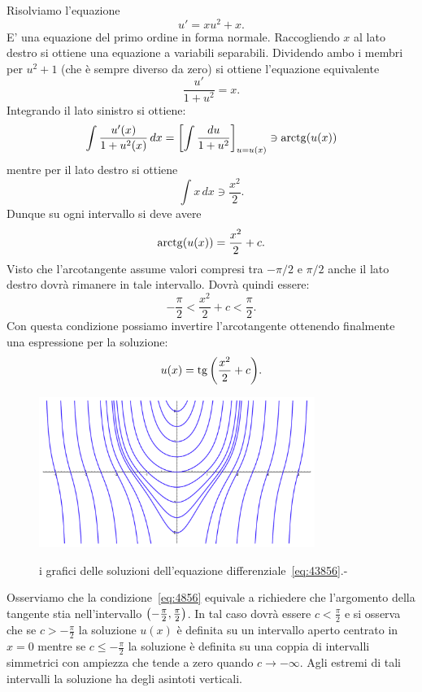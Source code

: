 \begin{example}
Risolviamo l'equazione
\begin{equation}\label{eq:43856}
  u' = x u^2 + x.
\end{equation}
E' una equazione del primo ordine in forma normale.
Raccogliendo $x$ al lato destro si ottiene una equazione a variabili separabili.
Dividendo ambo i membri per $u^2+1$ (che è sempre diverso da zero) si ottiene l'equazione equivalente
\[
\frac{u'}{1+u^2} = x.
\]
Integrando il lato sinistro si ottiene:
\[
  \int \frac{u'(x)}{1+u^2(x)}\, dx
  = {\left[ \int \frac{du}{1+u^2} \right]}_{u=u(x)}
  \ni \operatorname{arctg}(u(x))
\]
mentre per il lato destro si ottiene
\[
  \int x\, dx \ni \frac{x^2}{2}.
\]
Dunque su ogni intervallo si deve avere
\[
  \operatorname{arctg}(u(x)) = \frac{x^2}{2} + c.
\]
Visto che l'arcotangente assume valori compresi tra $-\pi/2$ e $\pi/2$ anche il lato destro dovrà rimanere in tale intervallo. Dovrà quindi essere:
\begin{equation}\label{eq:4856}
  -\frac \pi 2 < \frac {x^2} 2 + c < \frac \pi 2 .
\end{equation}
Con questa condizione possiamo invertire l'arcotangente ottenendo finalmente una espressione per la soluzione:
\begin{equation}\label{eq:45876314}
  u(x) = \operatorname{tg}{\left( \frac{x^2}{2} + c \right)}.
\end{equation}

\begin{figure}
\centering
\includegraphics[width=0.8\textwidth]{fig_43856.pdf}
\label{fig:43856}
\caption{i grafici delle soluzioni dell'equazione differenziale~\eqref{eq:43856}.-}
\end{figure}

Osserviamo che la condizione~\eqref{eq:4856} equivale a richiedere che l'argomento
della tangente stia nell'intervallo ${\left( -\frac \pi 2, \frac \pi 2 \right)}$.
In tal caso dovrà essere $c<\frac\pi 2$ e si osserva che se $c>-\frac \pi 2$
la soluzione $u(x)$ è definita su un intervallo aperto centrato in $x=0$ mentre
se $c \le -\frac \pi 2$ la soluzione è definita su una coppia di intervalli
simmetrici con ampiezza che tende a zero quando $c\to -\infty$.
Agli estremi di tali intervalli la soluzione ha degli asintoti verticali.


\end{example}
